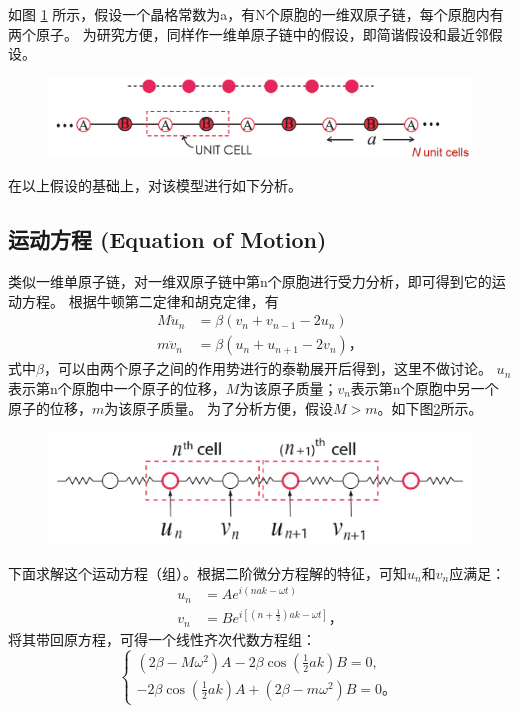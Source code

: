 \documentclass[declarePage]{ecnuthesis}
\begin{document}
如图 \ref{1DDC} 所示，假设一个晶格常数为a，有N个原胞的一维双原子链，每个原胞内有两个原子。
为研究方便，同样作一维单原子链中的假设，即简谐假设和最近邻假设。
\begin{figure}[htb]
    \centering
    \includegraphics[width=.7\textwidth]{1DDC.png}
    \label{1DDC}
\end{figure}

在以上假设的基础上，对该模型进行如下分析。

\subsection{运动方程 (Equation of Motion)}

类似一维单原子链，对一维双原子链中第n个原胞进行受力分析，即可得到它的运动方程。%
根据牛顿第二定律和胡克定律，有
\begin{align}
    M \ddot{u}_n &= \beta (v_n + v_{n-1} - 2u_n)\\
    m \ddot{v}_n &= \beta (u_n + u_{n+1} - 2v_n) \text{，}
\end{align}
式中$\beta$，可以由两个原子之间的作用势进行的泰勒展开后得到，这里不做讨论。%
$u_n$表示第n个原胞中一个原子的位移，$M$为该原子质量；$v_n$表示第n个原胞中另一个原子的位移，$m$为该原子质量。%
为了分析方便，假设$M>m$。如下图\ref{1DDCEOF}所示。
\begin{figure}[htb]
    \centering
    \includegraphics[width=.7\textwidth]{1DDCEOF.png}
    \label{1DDCEOF}
\end{figure}

下面求解这个运动方程（组）。根据二阶微分方程解的特征，可知$u_n$和$v_n$应满足：
\begin{align}
    u_n &= A e^{i(nak - \omega t)}\\
    v_n &= B e^{i[(n + \frac{1}{2}) ak - \omega t]} \text{，} \label{1DDCEOM}
\end{align}
将其带回原方程，可得一个线性齐次代数方程组：
\begin{equation}
    \begin{cases}
        (2 \beta - M \omega ^2)A-2 \beta \cos (\frac{1}{2}ak)B = 0,\\
        -2\beta\cos (\frac{1}{2}ak)A + (2\beta - m \omega ^2)B = 0 \text{。}
    \end{cases}
\end{equation}
\end{document}
